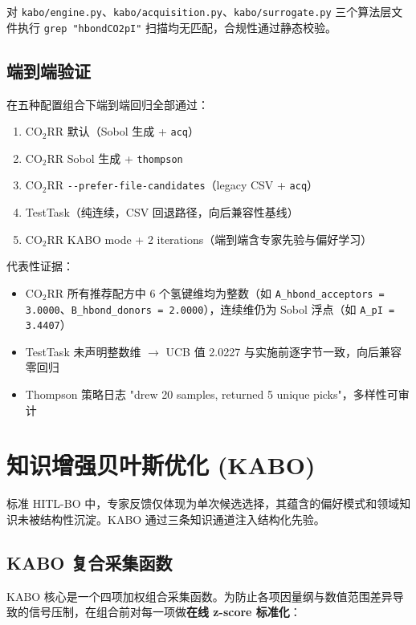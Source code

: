 \documentclass[12pt,a4paper]{article}
\newcommand{\brk}{\discretionary{}{}{}}
\begin{document}
对 \texttt{kabo/engine.py}、\texttt{kabo/acquisition.py}、\texttt{kabo/surrogate.py} 三个算法层文件执行 \texttt{grep "hbond\textbar{}CO2\textbar{}pI"} 扫描均无匹配，合规性通过静态校验。

\subsection{端到端验证}

在五种配置组合下端到端回归全部通过：
\begin{enumerate}
    \item CO$_2$RR 默认（Sobol 生成 + \texttt{acq}）
    \item CO$_2$RR Sobol 生成 + \texttt{thompson}
    \item CO$_2$RR \texttt{-{}-prefer-file-candidates}（legacy CSV + \texttt{acq}）
    \item TestTask（纯连续，CSV 回退路径，向后兼容性基线）
    \item CO$_2$RR KABO mode + 2 iterations（端到端含专家先验与偏好学习）
\end{enumerate}

代表性证据：
\begin{itemize}
    \item CO$_2$RR 所有推荐配方中 6 个氢键维均为整数（如 \texttt{A\_\brk hbond\_\brk acceptors = 3.0000}、\texttt{B\_\brk hbond\_\brk donors = 2.0000}），连续维仍为 Sobol 浮点（如 \texttt{A\_\brk pI = 3.4407}）
    \item TestTask 未声明整数维 $\to$ UCB 值 2.0227 与实施前逐字节一致，向后兼容零回归
    \item Thompson 策略日志 "drew 20 samples, returned 5 unique picks"，多样性可审计
\end{itemize}


\section{知识增强贝叶斯优化 (KABO)}

标准 HITL-BO 中，专家反馈仅体现为单次候选选择，其蕴含的偏好模式和领域知识未被结构性沉淀。KABO 通过三条知识通道注入结构化先验。

\subsection{KABO 复合采集函数}

KABO 核心是一个四项加权组合采集函数。为防止各项因量纲与数值范围差异导致的信号压制，在组合前对每一项做\textbf{在线 z-score 标准化}：
\end{document}
